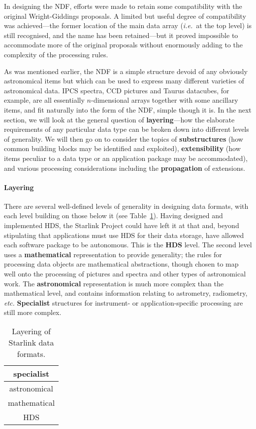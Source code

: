 In designing the NDF, efforts were made
to retain some compatibility
with the original Wright-Giddings proposals.  A limited but
useful degree of compatibility was achieved---the former
location of the main data array ({\it i.e.}\ at the top level) is
still recognised, and the name has been
retained---but it proved impossible to accommodate more
of the original proposals without enormously
adding to the complexity of the processing rules.

As was mentioned earlier, the NDF is a simple structure devoid
of any obviously astronomical items but which can be used
to express many different varieties of astronomical
data.  IPCS spectra, CCD pictures and Taurus datacubes, for example,
are all essentially $n$-dimensional arrays together with
some ancillary items, and fit naturally into the
form of the NDF, simple though it is.
In the next section, we will look at the
general question of {\bf layering}---how the
elaborate requirements of any particular data type can
be broken down into different levels of generality.  We
will then go on to consider
the topics of {\bf substructures} (how
common building blocks may be identified and exploited),
{\bf extensibility} (how items peculiar to a data type
or an application package may be accommodated), and
various processing considerations including the
{\bf propagation} of extensions.

\paragraph{Layering}
There are several well-defined levels of generality in designing
data formats, with each level building on those below it (see
Table~\ref{ta:layering}).  Having designed and implemented
HDS, the Starlink Project could have left it at that and,
beyond stipulating that applications must use HDS for their
data storage, have allowed each software package
to be autonomous.
This is the {\bf HDS} level.
The second level uses a {\bf mathematical}
representation to provide generality;  the rules for processing data
objects are mathematical abstractions, though chosen to map
well onto the processing of pictures and spectra and other
types of astronomical work.  The {\bf astronomical}
representation is much more complex than the mathematical level,
and contains information relating to astrometry, radiometry,
{\it etc.}
{\bf Specialist} structures for instrument- or application-specific
processing are still more complex.

\begin{table}[htb]
\centering
\caption{Layering of Starlink data formats.}
\label{ta:layering}
\begin{center}
\begin{tabular}{|c|}
\hline
specialist \\ \hline
astronomical \\ \hline
mathematical \\ \hline
HDS \\ \hline
\end{tabular}
\end{center}
\end{table}
\medskip

